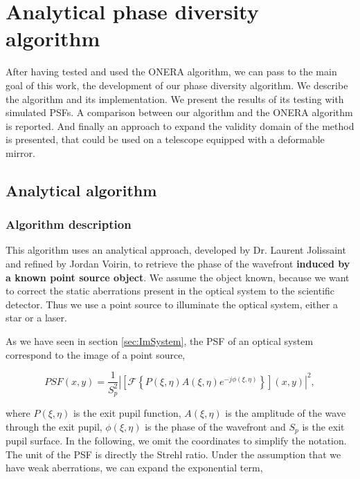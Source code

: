 \chapter{Analytical phase diversity algorithm} 
\label{ch:ourPD}

After having tested and used the ONERA algorithm, we can pass to the main goal of this work, the development of our phase diversity algorithm. We  describe the algorithm and its implementation. We present the results of its testing with simulated PSFs. A comparison between our algorithm and the ONERA algorithm is reported. And finally an approach to expand the validity domain of the method is presented, that could be used on a telescope equipped with a deformable mirror.

\section{Analytical algorithm}
\label{sec:AnAlgo}

\subsection{Algorithm description}
\label{subsec:ANalgoDesc}

This algorithm uses an analytical approach, developed by Dr. Laurent Jolissaint and refined by Jordan Voirin, to retrieve the phase of the wavefront \textbf{induced by a known point source object}. We assume the object known, because we want to correct the static aberrations present in the optical system to the scientific detector. Thus we use a point source to illuminate the optical system, either a star or a laser.

As we have seen in section \ref{sec:ImSystem}, the PSF of an optical system correspond to the image of a point source,

\begin{equation}
PSF(x,y) = \frac{1}{S_p^2}|\left[\mathcal{F}\left\lbrace P(\xi,\eta)A(\xi,\eta)e^{-j\phi(\xi,\eta)} \right\rbrace\right](x,y)|^2,
\label{eqt:PSF}
\end{equation}

where $P(\xi,\eta)$ is the exit pupil function, $A(\xi,\eta)$ is the amplitude of the wave through the exit pupil, $\phi(\xi,\eta)$ is the phase of the wavefront and $S_p$ is the exit pupil surface. In the following, we omit the coordinates to simplify the notation. The unit of the PSF is directly the Strehl ratio. Under the assumption that we have weak aberrations, we can expand the exponential term,

